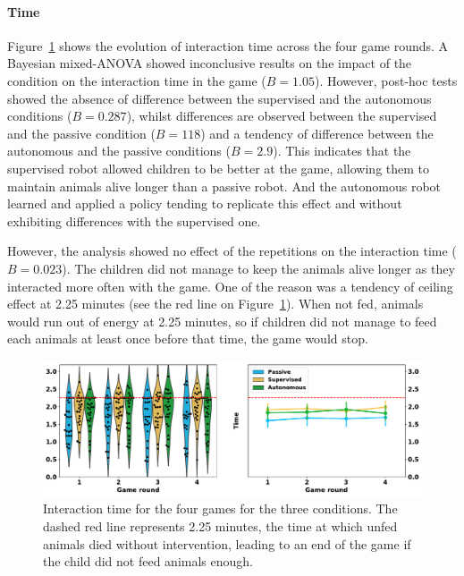 \paragraph{Time}

Figure~\ref{fig:tutoring_time} shows the evolution of interaction time across the four game rounds. A Bayesian mixed-ANOVA showed inconclusive results on the impact of the condition on the interaction time in the game ($B=1.05$). However, post-hoc tests showed the absence of difference between the supervised and the autonomous conditions ($B=0.287$), whilst differences are observed between the supervised and the passive condition ($B=118$) and a tendency of difference between the autonomous and the passive conditions ($B=2.9$). This indicates that the supervised robot allowed children to be better at the game, allowing them to maintain animals alive longer than a passive robot. And the autonomous robot learned and applied a policy tending to replicate this effect and without exhibiting differences with the supervised one.

However, the analysis showed no effect of the repetitions on the interaction time ($B=0.023$). The children did not manage to keep the animals alive longer as they interacted more often with the game. One of the reason was a tendency of ceiling effect at 2.25 minutes (see the red line on Figure~\ref{fig:tutoring_time}). When not fed, animals would run out of energy at 2.25 minutes, so if children did not manage to feed each animals at least once before that time, the game would stop. 

\begin{figure}[ht]
	\includegraphics[width=1\linewidth]{time.pdf}
	\centering
	\caption{Interaction time for the four games for the three conditions. The dashed red line represents 2.25 minutes, the time at which unfed animals died without intervention, leading to an end of the game if the child did not feed animals enough.}
	\label{fig:tutoring_time}
\end{figure}


